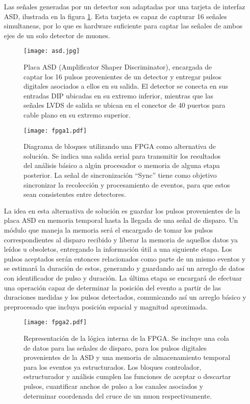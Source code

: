 Las señales generadas por un detector son adaptadas por una tarjeta de interfaz ASD\cite{1999ATLASICs}, ilustrada en la figura \ref{fig:asd}. Esta tarjeta es capaz de capturar 16 señales simultaneas, por lo que es hardware suficiente para captar las señales de ambos ejes de un solo detector de muones.

\begin{figure}[H]
	\centering
	\texttt{[image: asd.jpg]}
	\caption{Placa ASD\cite{1999ATLASICs} (Amplificator Shaper Discriminator), encargada de captar los 16 pulsos provenientes de un detector y entregar pulsos digitales asociados a ellos en su salida. El detector se conecta en sus entradas DIP ubicadas en su extremo inferior, mientras que las señales LVDS de salida se ubican en el conector de 40 puertos para cable plano en su extremo superior.}
	\label{fig:asd}
\end{figure}

\begin{figure}[H]
	\centering
	\texttt{[image: fpga1.pdf]}
	\caption{Diagrama de bloques utilizando una FPGA como alternativa de solución. Se indica una salida serial para transmitir los resultados del análisis básico a algún procesador o memoria de alguna etapa posterior. La señal de sincronización ``Sync'' tiene como objetivo sincronizar la recolección y procesamiento de eventos, para que estos sean consistentes entre detectores.}
	\label{fig:fpga1}
\end{figure}


La idea en esta alternativa de solución es guardar los pulsos provenientes de la placa ASD en memoria temporal hasta la llegada de una señal de disparo. Un módulo que maneja la memoria será el encargado de tomar los pulsos correspondientes al disparo recibido y liberar la memoria de aquellos datos ya leídos u obsoletos, entregando la información útil a una siguiente etapa. Los pulsos aceptados serán entonces relacionados como parte de un mismo eventos y se estimará la duración de estos, generando y guardando así un arreglo de datos con identificador de pulso y duración. La última etapa se encargará de efectuar una operación capaz de determinar la posición del evento a partir de las duraciones medidas y los pulsos detectados, comunicando así un arreglo básico y preprocesado que incluya posición espacial y magnitud aproximada.


\begin{figure}[H]
	\centering
	\texttt{[image: fpga2.pdf]}
	\caption{Representación de la lógica interna de la FPGA. Se incluye una cola de datos para las señales de disparo, para los pulsos digitales provenientes de la ASD y una memoria de almacenamiento temporal para los eventos ya estructurados. Los bloques controlador, estructurador y análisis cumplen las funciones de aceptar o descartar pulsos, cuantificar anchos de pulso a  los canales asociados y determinar coordenada del cruce de un muon respectivamente.}
	\label{fig:fpga2}
\end{figure}

